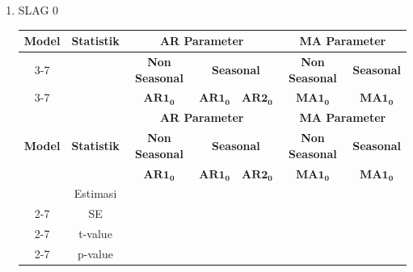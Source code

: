 \begin{enumerate}[label=\alph*.]
    \item SLAG 0
        \scriptsize
        \begin{longtable}{|c|c|c|c|c|c|c|}
            \hline
            \multirow{3}{*}{\textbf{Model}} &
            \multirow{3}{*}{\textbf{Statistik}} &
            \multicolumn{3}{|c|}{\textbf{AR Parameter}} &
            \multicolumn{2}{|c|}{\textbf{MA Parameter}} \\ \cline{3-7}
            & &
            \multicolumn{1}{|c|}{\textbf{Non Seasonal}} &
            \multicolumn{2}{|c|}{\textbf{Seasonal}} &
            \multicolumn{1}{|c|}{\textbf{Non Seasonal}} &
            \textbf{Seasonal} \\ \cline{3-7}
            & &
            $\mathbf{AR1_0}$ &
            $\mathbf{AR1_0}$ &
            $\mathbf{AR2_0}$ &
            $\mathbf{MA1_0}$ &
            $\mathbf{MA1_0}$ \\
            \hline
            \endfirsthead

            \hline
            \multirow{3}{*}{\textbf{Model}} &
            \multirow{3}{*}{\textbf{Statistik}} &
            \multicolumn{3}{|c|}{\textbf{AR Parameter}} &
            \multicolumn{2}{|c|}{\textbf{MA Parameter}} \\ \cline{3-7}
            & &
            \multicolumn{1}{|c|}{\textbf{Non Seasonal}} &
            \multicolumn{2}{|c|}{\textbf{Seasonal}} &
            \multicolumn{1}{|c|}{\textbf{Non Seasonal}} &
            \textbf{Seasonal} \\ \cline{3-7}
            & &
            $\mathbf{AR1_0}$ &
            $\mathbf{AR1_0}$ &
            $\mathbf{AR2_0}$ &
            $\mathbf{MA1_0}$ &
            $\mathbf{MA1_0}$ \\
            \hline
            \endhead

            \hline
            \endfoot
            \hline
            \endlastfoot

            \multirow{4}{*}{$(0,0,0)\times(0,1,0)_{12}$}
            & Estimasi & {} & {} & {} & {} & {} \\ \cline{2-7}
            & SE       & {} & {} & {} & {} & {} \\ \cline{2-7}
            & t-value  & {} & {} & {} & {} & {} \\ \cline{2-7}
            & p-value  & {} & {} & {} & {} & {} \\ \hline


\end{longtable}
\end{enumerate}
